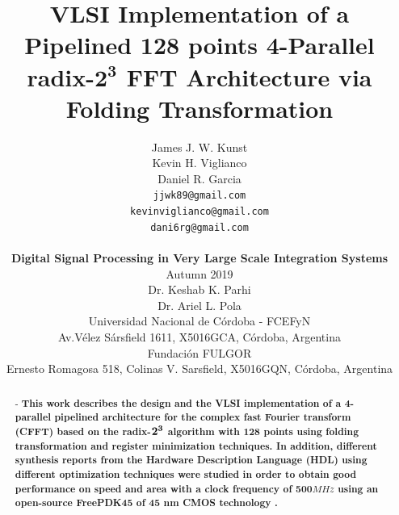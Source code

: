 \documentclass[journal,comsoc]{IEEEtran}
\begin{document}
\title{
\huge \bf VLSI Implementation of a Pipelined 128 points 4-Parallel radix-$\mathbf{2^3}$ FFT Architecture via Folding Transformation\\
}
\author{
\begin{minipage}{0.4\linewidth}
	\raggedleft
	James J. W. Kunst\\
	Kevin H. Viglianco\\
	Daniel R. Garcia
\end{minipage}
\begin{minipage}{0.4\linewidth}
	\raggedright	
	{\tt\small jjwk89@gmail.com}\\
	{\tt\small kevinviglianco@gmail.com}\\	
	{\tt\small dani6rg@gmail.com}			
\end{minipage}			
\\		
[0.5cm]
{\large \bf Digital Signal Processing in Very Large Scale Integration Systems}\\
[0.5cm]
Autumn 2019\\
[0.5cm]
Dr. Keshab K. Parhi	\\
Dr. Ariel L. Pola	\\
[0.5cm]
Universidad Nacional de Córdoba - FCEFyN\\
Av.Vélez Sársfield 1611, X5016GCA, C\'ordoba, Argentina\\
[0.5cm]
Fundación FULGOR\\
Ernesto Romagosa 518, Colinas V. Sarsfield, X5016GQN, Córdoba, Argentina%
}
\maketitle


\begin{abstract} - \bf This work describes the design and the VLSI implementation of a 4-parallel pipelined architecture for the complex fast Fourier transform (CFFT) based on the radix-$\bf 2^3$ algorithm with 128 points using folding transformation and register minimization techniques. In addition, different synthesis reports from the Hardware Description Language (HDL) using different optimization techniques were studied in order to obtain good performance on speed and area with a clock frequency of 500$MHz$ using an open-source FreePDK45 of 45 nm CMOS technology \cite{freePdk}.
\end{abstract}
\end{document}
